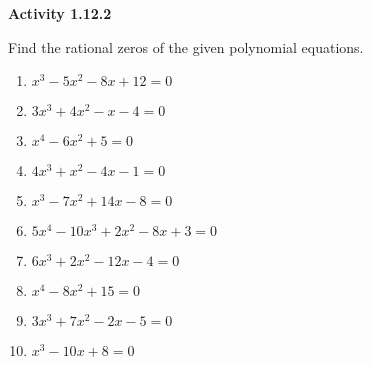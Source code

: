\vspace{0.3ex}
\noindent\textbf{Activity 1.12.2}

\vspace{0.2ex}

Find the rational zeros of the given polynomial equations.
\begin{multicols}{2}
\begin{enumerate}
    \item $x^3 - 5x^2 - 8x + 12 = 0$
    \item $3x^3 + 4x^2 - x - 4 = 0$
    \item $x^4 - 6x^2 + 5 = 0$
    \item $4x^3 + x^2 - 4x - 1 = 0$
    \item $x^3 - 7x^2 + 14x - 8 = 0$
    \item $5x^4 - 10x^3 + 2x^2 - 8x + 3 = 0$
    \item $6x^3 + 2x^2 - 12x - 4 = 0$
    \item $x^4 - 8x^2 + 15 = 0$
    \item $3x^3 + 7x^2 - 2x - 5 = 0$
    \item $x^3 - 10x + 8 = 0$
    \end{enumerate}
    \end{multicols}
